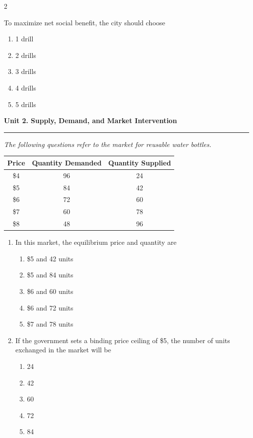 \documentclass[10pt]{article}
\newenvironment{choiceslist}
  {\begin{enumerate}[label=(\Alph*), leftmargin=1.6em, itemsep=0.12em, topsep=0.18em, parsep=0pt]}
  {\end{enumerate}}
\newenvironment{stimulus}
  {\begin{center}\begin{minipage}{0.96\columnwidth}\footnotesize\itshape\setlength{\tabcolsep}{3pt}\renewcommand{\arraystretch}{0.96}}
  {\end{minipage}\end{center}}
\newcommand{\unitheader}[2]{%
  \vspace{0.35em}
  {\large\bfseries Unit #1. #2\par}
  \vspace{0.2em}
  \hrule
  \vspace{0.45em}
}
\begin{document}
\begin{multicols*}{2}
\begin{enumerate}[resume*=apq, leftmargin=*, itemsep=0.85em, topsep=0.2em, parsep=0pt]
                        To maximize net social benefit, the city should choose
                        
\begin{choiceslist}
\item 1 drill
\item 2 drills
\item 3 drills
\item 4 drills
\item 5 drills
\end{choiceslist}
\end{enumerate}
\unitheader{2}{Supply, Demand, and Market Intervention}
\begin{stimulus}
The following questions refer to the market for reusable water bottles.

\begin{center}
\begin{tabular}{ccc}
\toprule
Price & Quantity Demanded & Quantity Supplied \\
\midrule
\$4 & 96 & 24 \\
\$5 & 84 & 42 \\
\$6 & 72 & 60 \\
\$7 & 60 & 78 \\
\$8 & 48 & 96 \\
\bottomrule
\end{tabular}
\end{center}
\end{stimulus}
\begin{enumerate}[resume*=apq, leftmargin=*, itemsep=0.85em, topsep=0.2em, parsep=0pt]
\item In this market, the equilibrium price and quantity are
\begin{choiceslist}
\item \$5 and 42 units
\item \$5 and 84 units
\item \$6 and 60 units
\item \$6 and 72 units
\item \$7 and 78 units
\end{choiceslist}
\item If the government sets a binding price ceiling of \$5, the number of units exchanged in the market will be
\begin{choiceslist}
\item 24
\item 42
\item 60
\item 72
\item 84

\end{choiceslist}
\end{enumerate}
\end{multicols*}
\end{document}
